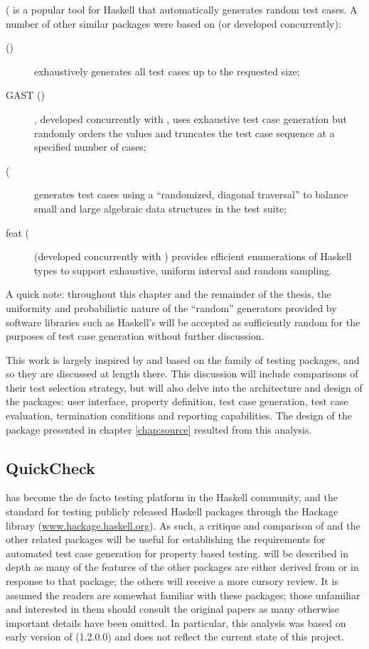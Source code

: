 \QC  (\citep{Claessen2000} is a popular \pbt tool for Haskell
that automatically generates random test cases.
A number of other similar packages were
based on \QC (or developed concurrently):

\begin{description}
\item[\SC (\citep{Runcimanetal2008}) ] exhaustively generates all test cases up to the requested size;
\item[GAST (\cite{GAST2002})],  developed concurrently with \QC,
uses exhaustive test case generation but randomly orders the values
and truncates the test case sequence at a specified number of cases;
\item[\EC (\cite{EasyCheck2008}] generates test cases using a
``randomized, diagonal traversal'' to balance small and large algebraic data structures in the test suite;
\item[feat (\cite {Duregard2012}] (developed concurrently with \GC) 
provides efficient enumerations of Haskell types to support exhaustive, uniform interval and random sampling.
\end{description}

A quick note: throughout this chapter and the remainder of the thesis,
the uniformity and probabilistic nature of the ``random'' generators 
provided by software libraries such as Haskell's will be accepted
as sufficiently random for the purposes of test case generation
without further discussion.

This work is largely inspired by and based on the \QC family of testing packages,
and so they are discussed at length there.
This discussion will include comparisons of their test selection strategy,
but will also delve into the architecture and design of the packages:
user interface, property definition, test case generation, test case evaluation, termination conditions and reporting capabilities.
The design of the \GC package presented in chapter \ref{chap:source} 
resulted from this analysis.

\subsection{QuickCheck}\label{sub:quickcheck}

\QC has become the de facto testing platform in the Haskell community,
and the standard for testing publicly released Haskell packages 
through the Hackage library (\url{www.hackage.haskell.org}).
As such, a critique and comparison of \QC and the other related packages
will be useful for establishing the requirements for 
automated test case generation for property based testing.
\QC will be described in depth
as many of the features of the other packages are either 
derived from or in response to that package;
the others will receive a more cursory review.
It is assumed the readers are somewhat familiar with these packages;
those unfamiliar and interested in them should consult the original papers 
as many otherwise important details have been omitted.
In particular, this analysis was based on early version of \QC (1.2.0.0) and
does not reflect the current state of this project.

